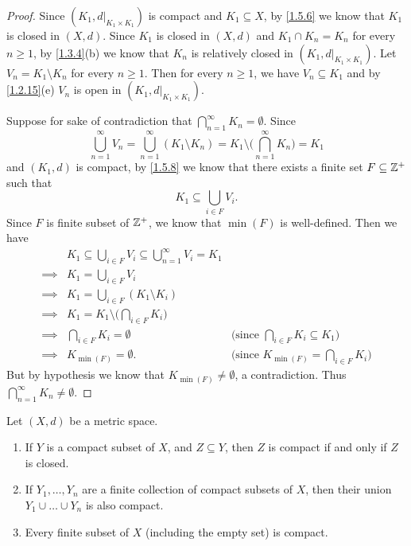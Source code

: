 \begin{proof}
  Since \((K_1, d|_{K_1 \times K_1})\) is compact and \(K_1 \subseteq X\), by \cref{1.5.6} we know that \(K_1\) is closed in \((X, d)\).
  Since \(K_1\) is closed in \((X, d)\) and \(K_1 \cap K_n = K_n\) for every \(n \geq 1\), by \cref{1.3.4}(b) we know that \(K_n\) is relatively closed in \((K_1, d|_{K_1 \times K_1})\).
  Let \(V_n = K_1 \setminus K_n\) for every \(n \geq 1\).
  Then for every \(n \geq 1\), we have \(V_n \subseteq K_1\) and by \cref{1.2.15}(e) \(V_n\) is open in \((K_1, d|_{K_1 \times K_1})\).

  Suppose for sake of contradiction that \(\bigcap_{n = 1}^\infty K_n = \emptyset\).
  Since
  \[
    \bigcup_{n = 1}^\infty V_n = \bigcup_{n = 1}^\infty (K_1 \setminus K_n) = K_1 \setminus \bigg(\bigcap_{n = 1}^\infty K_n\bigg) = K_1
  \]
  and \((K_1, d)\) is compact, by \cref{1.5.8} we know that there exists a finite set \(F \subseteq \mathbb{Z}^+\) such that
  \[
    K_1 \subseteq \bigcup_{i \in F} V_i.
  \]
  Since \(F\) is finite subset of \(\mathbb{Z}^+\), we know that \(\min(F)\) is well-defined.
  Then we have
  \begin{align*}
             & K_1 \subseteq \bigcup_{i \in F} V_i \subseteq \bigcup_{n = 1}^\infty V_i = K_1                                                          \\
    \implies & K_1 = \bigcup_{i \in F} V_i                                                                                                             \\
    \implies & K_1 = \bigcup_{i \in F} (K_1 \setminus K_i)                                                                                             \\
    \implies & K_1 = K_1 \setminus \bigg(\bigcap_{i \in F} K_i\bigg)                                                                                   \\
    \implies & \bigcap_{i \in F} K_i = \emptyset                                              & \text{(since \(\bigcap_{i \in F} K_i \subseteq K_1)\)} \\
    \implies & K_{\min(F)} = \emptyset.                                                       & \text{(since \(K_{\min(F)} = \bigcap_{i \in F} K_i)\)}
  \end{align*}
  But by hypothesis we know that \(K_{\min(F)} \neq \emptyset\), a contradiction.
  Thus \(\bigcap_{n = 1}^\infty K_n \neq \emptyset\).
\end{proof}

\begin{thm}\label{1.5.10}
  Let \((X, d)\) be a metric space.
  \begin{enumerate}
    \item If \(Y\) is a compact subset of \(X\), and \(Z \subseteq Y\), then \(Z\) is compact if and only if \(Z\) is closed.
    \item If \(Y_1, \dots, Y_n\) are a finite collection of compact subsets of \(X\), then their union \(Y_1 \cup \dots \cup Y_n\) is also compact.
    \item Every finite subset of \(X\) (including the empty set) is compact.
  \end{enumerate}
\end{thm}

